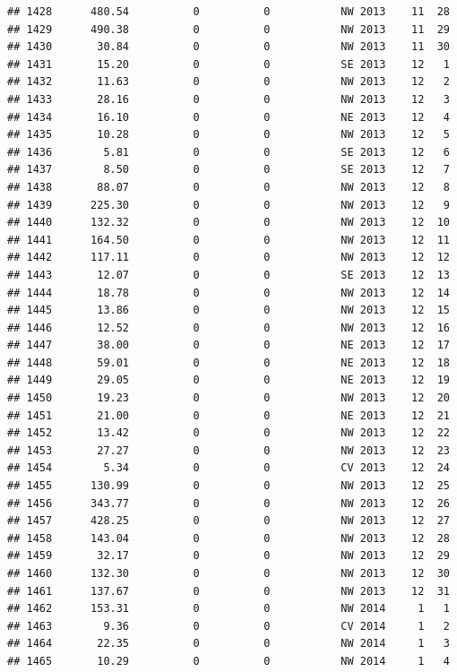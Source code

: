 \documentclass[
]{article}
\begin{document}
\begin{verbatim}
## 1428      480.54          0          0           NW 2013    11  28
## 1429      490.38          0          0           NW 2013    11  29
## 1430       30.84          0          0           NW 2013    11  30
## 1431       15.20          0          0           SE 2013    12   1
## 1432       11.63          0          0           NW 2013    12   2
## 1433       28.16          0          0           NW 2013    12   3
## 1434       16.10          0          0           NE 2013    12   4
## 1435       10.28          0          0           NW 2013    12   5
## 1436        5.81          0          0           SE 2013    12   6
## 1437        8.50          0          0           SE 2013    12   7
## 1438       88.07          0          0           NW 2013    12   8
## 1439      225.30          0          0           NW 2013    12   9
## 1440      132.32          0          0           NW 2013    12  10
## 1441      164.50          0          0           NW 2013    12  11
## 1442      117.11          0          0           NW 2013    12  12
## 1443       12.07          0          0           SE 2013    12  13
## 1444       18.78          0          0           NW 2013    12  14
## 1445       13.86          0          0           NW 2013    12  15
## 1446       12.52          0          0           NW 2013    12  16
## 1447       38.00          0          0           NE 2013    12  17
## 1448       59.01          0          0           NE 2013    12  18
## 1449       29.05          0          0           NE 2013    12  19
## 1450       19.23          0          0           NW 2013    12  20
## 1451       21.00          0          0           NE 2013    12  21
## 1452       13.42          0          0           NW 2013    12  22
## 1453       27.27          0          0           NW 2013    12  23
## 1454        5.34          0          0           CV 2013    12  24
## 1455      130.99          0          0           NW 2013    12  25
## 1456      343.77          0          0           NW 2013    12  26
## 1457      428.25          0          0           NW 2013    12  27
## 1458      143.04          0          0           NW 2013    12  28
## 1459       32.17          0          0           NW 2013    12  29
## 1460      132.30          0          0           NW 2013    12  30
## 1461      137.67          0          0           NW 2013    12  31
## 1462      153.31          0          0           NW 2014     1   1
## 1463        9.36          0          0           CV 2014     1   2
## 1464       22.35          0          0           NW 2014     1   3
## 1465       10.29          0          0           NW 2014     1   4

\end{verbatim}
\end{document}
